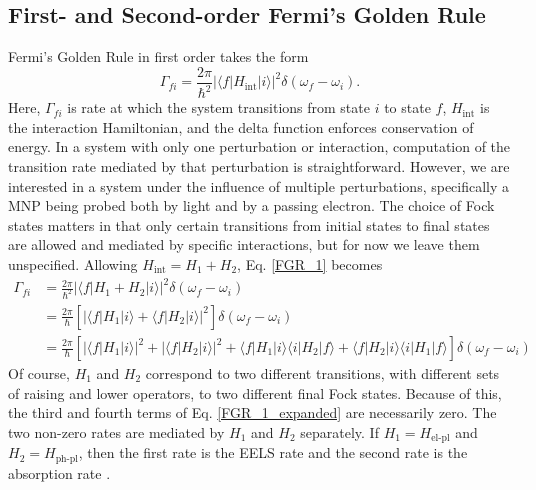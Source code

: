 \documentclass [11pt, proquest] {uwthesis}[2016/11/22]
\begin{document}
\subsection{First- and Second-order Fermi's Golden Rule}

Fermi's Golden Rule in first order takes the form
\begin{equation}
\Gamma_{fi} = \frac{2\pi}{\hbar^2}|\langle f |H_{\textrm{int}}| i \rangle |^2 \delta(\omega_f - \omega_i).
\label{FGR_1}
\end{equation}
Here, $\Gamma_{fi}$ is rate at which the system transitions from state $i$ to state $f$, $H_{\textrm{int}}$ is the interaction Hamiltonian, and the delta function enforces conservation of energy. In a system with only one perturbation or interaction, computation of the transition rate mediated by that perturbation is straightforward. However, we are interested in a system under the influence of multiple perturbations, specifically a MNP being probed both by light and by a passing electron. The choice of Fock states matters in that only certain transitions from initial states to final states are allowed and mediated by specific interactions, but for now we leave them unspecified. Allowing $H_{\textrm{int}} = H_1 + H_2$, Eq. \ref{FGR_1} becomes
\begin{equation}
\begin{aligned}
\Gamma_{fi} &= \frac{2\pi}{\hbar^2}|\langle f |H_1 + H_2| i \rangle |^2 \delta(\omega_f - \omega_i)\\
&= \frac{2\pi}{\hbar}\left[|\langle f |H_1| i \rangle + \langle f |H_2| i \rangle |^2\right] \delta(\omega_f - \omega_i)\\
& = \frac{2\pi}{\hbar}\left[|\langle f|H_1|i \rangle|^2 + |\langle f|H_2|i \rangle|^2 + \langle f|H_1|i \rangle \langle i|H_2|f \rangle + \langle f|H_2|i \rangle \langle i|H_1|f \rangle\right]\delta(\omega_f - \omega_i)
\label{FGR_1_expanded}
\end{aligned}
\end{equation}
Of course, $H_1$ and $H_2$ correspond to two different transitions, with different sets of raising and lower operators, to two different final Fock states. Because of this, the third and fourth terms of Eq. \ref{FGR_1_expanded} are necessarily zero. The two non-zero rates are mediated by $H_1$ and $H_2$ separately. If $H_1 = H_\textrm{el-pl}$ and $H_2 = H_{\textrm{ph-pl}}$, then the first rate is the EELS rate and the second rate is the absorption rate \cite{EEGS}.
\end{document}
